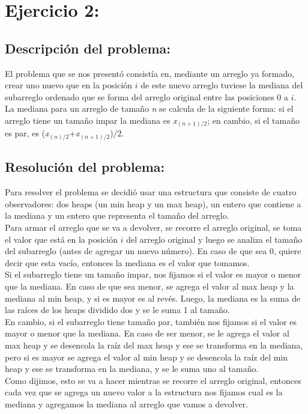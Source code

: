 \documentclass{article}
\begin{document}
	\section{Ejercicio 2:}
		\subsection{Descripci\'on del problema:}
		El problema que se nos present\'o consist\'ia en, mediante un arreglo ya formado, crear uno nuevo que en la posici\'on $i$ de este nuevo arreglo tuviese la mediana del subarreglo ordenado que se forma del arreglo original entre las posiciones 0 a $i$.
		\\ La mediana para un arreglo de tama\~no \textit{n}  se calcula de la siguiente forma: si el arreglo tiene un tama\~no impar la mediana es \textit{x$_{(n+1)/2}$}; en cambio, si el tama\~no es par, es (\textit{x$_{(n)/2}$}+\textit{x$_{(n+1)/2}$})$/2$.
		\subsection{Resoluci\'on del problema:}
		Para resolver el problema se decidi\'o usar una estructura que consiste de cuatro observadores: dos heaps (un min heap y un max heap), un entero que contiene a la mediana y un entero que representa el tamaño del arreglo.
		\\ Para armar el arreglo que se va a devolver, se recorre el arreglo original, se toma el valor que est\'a en la posici\'on $i$ del arreglo original y luego se analiza el tama\~no del subarreglo (antes de agregar un nuevo n\'umero). En caso de que sea 0, quiere decir que esta vac\'io, entonces la mediana es el valor que tomamos.
		\\Si el subarreglo tiene un tama\~no impar, nos fijamos si el valor es mayor o menor que la mediana. En caso de que sea menor, se agrega el valor al max heap y la mediana al min heap, y si es mayor es al rev\'es. Luego, la mediana es la suma de las ra\'ices de los heaps dividido dos y se le suma 1 al tama\~no.
		\\En cambio, si el subarreglo tiene tama\~no par, tambi\'en nos fijamos si el valor es mayor o menor que la mediana. En caso de ser menor, se le agrega el valor al max heap y se desencola la ra\'iz del max heap y ese se transforma en la mediana, pero si es mayor se agrega el valor al min heap y se desencola la ra\'iz del min heap y ese se transforma en la mediana, y se le suma uno al tama\~no.
		\\Como dijimos, esto se va a hacer mientras se recorre el arreglo original, entonces cada vez que se agrega un nuevo valor a la estructura nos fijamos cual es la mediana y agregamos la mediana al arreglo que vamos a devolver.
\end{document}
